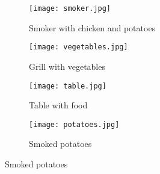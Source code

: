 \documentclass{article}
\begin{document}
\newpage

\begin{figure}[h]
    \centering
    \begin{subfigure}{.48\textwidth}
        \centering
        \texttt{[image: smoker.jpg]}
        \caption{Smoker with chicken and potatoes}
        \label{fig:smoker}
        \vspace{0.1in}
    \end{subfigure}%
    \hspace{\fill}%
    \begin{subfigure}{.48\textwidth}
        \centering
        \texttt{[image: vegetables.jpg]}
        \caption{Grill with vegetables}
        \label{fig:vegetables}
        \vspace{0.1in}
    \end{subfigure}
    \begin{subfigure}{.48\textwidth}
        \centering
        \texttt{[image: table.jpg]}
        \caption{Table with food}
        \label{fig:table}
    \end{subfigure}%
    \hspace{\fill}%
    \begin{subfigure}{.48\textwidth}
        \centering
        \texttt{[image: potatoes.jpg]}
        \caption{Smoked potatoes}
        \label{fig:potatoes}
    \end{subfigure}
\end{figure}
\end{document}
